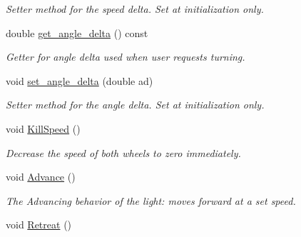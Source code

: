 \begin{DoxyCompactItemize}
\begin{DoxyCompactList}\small\item\em Setter method for the speed delta. Set at initialization only. \end{DoxyCompactList}\item 
double \hyperlink{classMotionHandler_a67c945d11edc741af5c71c3596ead557}{get\+\_\+angle\+\_\+delta} () const \hypertarget{classMotionHandler_a67c945d11edc741af5c71c3596ead557}{}\label{classMotionHandler_a67c945d11edc741af5c71c3596ead557}

\begin{DoxyCompactList}\small\item\em Getter for angle delta used when user requests turning. \end{DoxyCompactList}\item 
void \hyperlink{classMotionHandler_a8c2811ddf1a0f077fec829c460009286}{set\+\_\+angle\+\_\+delta} (double ad)\hypertarget{classMotionHandler_a8c2811ddf1a0f077fec829c460009286}{}\label{classMotionHandler_a8c2811ddf1a0f077fec829c460009286}

\begin{DoxyCompactList}\small\item\em Setter method for the angle delta. Set at initialization only. \end{DoxyCompactList}\item 
void \hyperlink{classMotionHandler_a9a94d7b651c2cf4a0a8ef7ba12354c24}{Kill\+Speed} ()\hypertarget{classMotionHandler_a9a94d7b651c2cf4a0a8ef7ba12354c24}{}\label{classMotionHandler_a9a94d7b651c2cf4a0a8ef7ba12354c24}

\begin{DoxyCompactList}\small\item\em Decrease the speed of both wheels to zero immediately. \end{DoxyCompactList}\item 
void \hyperlink{classMotionHandler_a259b14f5c68b24a93fd3e1f463055e32}{Advance} ()\hypertarget{classMotionHandler_a259b14f5c68b24a93fd3e1f463055e32}{}\label{classMotionHandler_a259b14f5c68b24a93fd3e1f463055e32}

\begin{DoxyCompactList}\small\item\em The Advancing behavior of the light\+: moves forward at a set speed. \end{DoxyCompactList}\item 
void \hyperlink{classMotionHandler_a1e732c722f9555071f37754a6ac13d6a}{Retreat} ()\hypertarget{classMotionHandler_a1e732c722f9555071f37754a6ac13d6a}{}\label{classMotionHandler_a1e732c722f9555071f37754a6ac13d6a}


\end{DoxyCompactItemize}
